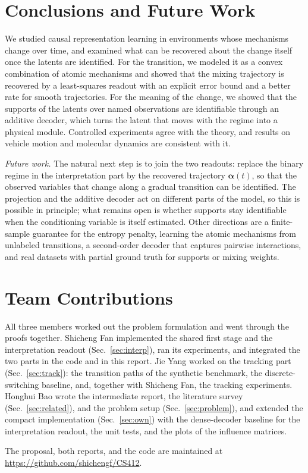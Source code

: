 \documentclass[10pt,twocolumn,letterpaper]{article}
\newcommand{\valpha}{\boldsymbol{\alpha}}
\newcommand{\para}[1]{\textit{#1.}}
\theoremstyle{definition}
\begin{document}
\section{Conclusions and Future Work}
\label{sec:conclusion}

We studied causal representation learning in environments whose mechanisms change over time, and examined what can be recovered about the change itself once the latents are identified.
For the transition, we modeled it as a convex combination of atomic mechanisms and showed that the mixing trajectory is recovered by a least-squares readout with an explicit error bound and a better rate for smooth trajectories.
For the meaning of the change, we showed that the supports of the latents over named observations are identifiable through an additive decoder, which turns the latent that moves with the regime into a physical module.
Controlled experiments agree with the theory, and results on vehicle motion and molecular dynamics are consistent with it.

\para{Future work}
The natural next step is to join the two readouts: replace the binary regime in the interpretation part by the recovered trajectory $\valpha(t)$, so that the observed variables that change along a gradual transition can be identified.
The projection and the additive decoder act on different parts of the model, so this is possible in principle; what remains open is whether supports stay identifiable when the conditioning variable is itself estimated.
Other directions are a finite-sample guarantee for the entropy penalty, learning the atomic mechanisms from unlabeled transitions, a second-order decoder that captures pairwise interactions, and real datasets with partial ground truth for supports or mixing weights.

\section*{Team Contributions}
All three members worked out the problem formulation and went through the proofs together.
Shicheng Fan implemented the shared first stage and the interpretation readout (Sec.~\ref{sec:interp}), ran its experiments, and integrated the two parts in the code and in this report.
Jie Yang worked on the tracking part (Sec.~\ref{sec:track}): the transition paths of the synthetic benchmark, the discrete-switching baseline, and, together with Shicheng Fan, the tracking experiments.
Honghui Bao wrote the intermediate report, the literature survey (Sec.~\ref{sec:related}), and the problem setup (Sec.~\ref{sec:problem}), and extended the compact implementation (Sec.~\ref{sec:own}) with the dense-decoder baseline for the interpretation readout, the unit tests, and the plots of the influence matrices.

The proposal, both reports, and the code are maintained at \url{https://github.com/shichengf/CS412}.

\nocite{fan2026mosaic,fan2026trace}
{
    \footnotesize
    
    
}
\end{document}
